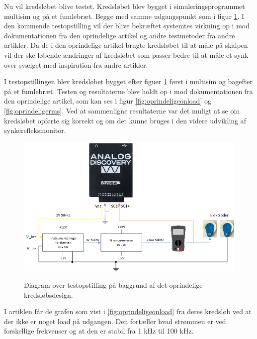 Nu vil kredsløbet blive testet. Kredsløbet blev bygget i simuleringsprogrammet multisim og på et fumlebræt. Begge med samme udgangspunkt som i figur \ref{fig:testopstilling1}. I den kommende testopstilling vil der blive bekræftet systemtes virkning op i mod dokumentationen fra den oprindelige artikel og andre testmetoder fra andre artikler. Da de i den oprindelige artikel brugte kredsløbet til at måle på skalpen vil der ske løbende ændringer af kredsløbet som passer bedre til at måle et synk over svælget med inspiration fra andre artikler. 





I testopstillingen blev kredsløbet bygget efter figuer \ref{fig:testopstilling1} først i multisim og bagefter på et fumlebræt. Testen og resultaterne blev holdt op i mod dokumentationen fra den oprindelige artikel, som kan ses i figur \ref{fig:oprindeligeonload} og \ref{fig:oprindeligerms}. Ved at sammenligne resultaterne var det muligt at se om kredsløbet opførte sig korrekt og om det kunne bruges i den videre udvikling af synkerefleksmonitor. 

\begin{figure}[H]
\centering
{\includegraphics[width=\linewidth]
{Figure/testopstilling11}}
\caption{Diagram over testopstilling  på baggrund af det oprindelige kredsløbsdesign.}
\label{fig:testopstilling1}
\end{figure}

I artiklen får de grafen som vist i \ref{fig:oprindeligeonload} fra deres kredsløb ved at der ikke er noget load på udgangen. Den fortæller hvad strømmen er ved forskellige frekvenser og at den er stabil fra 1 kHz til 100 kHz. 

